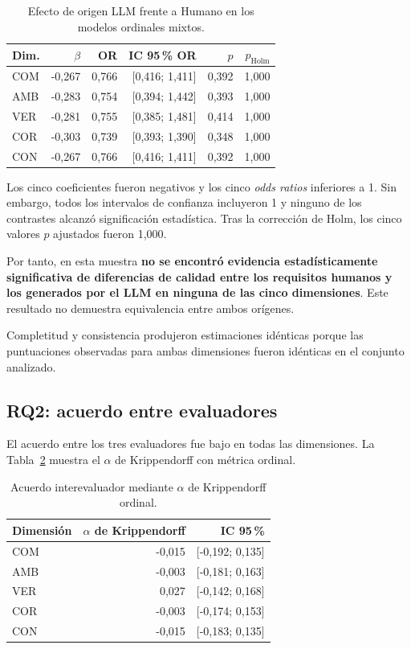 \documentclass[runningheads]{llncs}
\begin{document}
\begin{table}[ht]
\centering
\caption{Efecto de origen LLM frente a Humano en los modelos ordinales mixtos.}
\label{tab:rq1}
\small
\begin{tabular}{lrrrrr}
\hline
Dim. & $\beta$ & OR & IC 95\,\% OR & $p$ & $p_{\mathrm{Holm}}$ \\
\hline
COM & -0,267 & 0,766 & [0,416; 1,411] & 0,392 & 1,000 \\
AMB & -0,283 & 0,754 & [0,394; 1,442] & 0,393 & 1,000 \\
VER & -0,281 & 0,755 & [0,385; 1,481] & 0,414 & 1,000 \\
COR & -0,303 & 0,739 & [0,393; 1,390] & 0,348 & 1,000 \\
CON & -0,267 & 0,766 & [0,416; 1,411] & 0,392 & 1,000 \\
\hline
\end{tabular}
\end{table}

Los cinco coeficientes fueron negativos y los cinco \emph{odds ratios} inferiores
a 1. Sin embargo, todos los intervalos de confianza incluyeron 1 y ninguno de los
contrastes alcanz\'o significaci\'on estad\'istica. Tras la correcci\'on de Holm,
los cinco valores $p$ ajustados fueron 1,000.

Por tanto, en esta muestra \textbf{no se encontr\'o evidencia estad\'isticamente
significativa de diferencias de calidad entre los requisitos humanos y los
generados por el LLM en ninguna de las cinco dimensiones}. Este resultado no
demuestra equivalencia entre ambos or\'igenes.

Completitud y consistencia produjeron estimaciones id\'enticas porque las
puntuaciones observadas para ambas dimensiones fueron id\'enticas en el conjunto
analizado.

\subsection{RQ2: acuerdo entre evaluadores}

El acuerdo entre los tres evaluadores fue bajo en todas las dimensiones. La
Tabla~\ref{tab:rq2} muestra el $\alpha$ de Krippendorff con m\'etrica ordinal.

\begin{table}[ht]
\centering
\caption{Acuerdo interevaluador mediante $\alpha$ de Krippendorff ordinal.}
\label{tab:rq2}
\begin{tabular}{lrr}
\hline
Dimensi\'on & $\alpha$ de Krippendorff & IC 95\,\% \\
\hline
COM & -0,015 & [-0,192; 0,135] \\
AMB & -0,003 & [-0,181; 0,163] \\
VER & 0,027 & [-0,142; 0,168] \\
COR & -0,003 & [-0,174; 0,153] \\
CON & -0,015 & [-0,183; 0,135] \\
\hline
\end{tabular}
\end{table}
\end{document}
